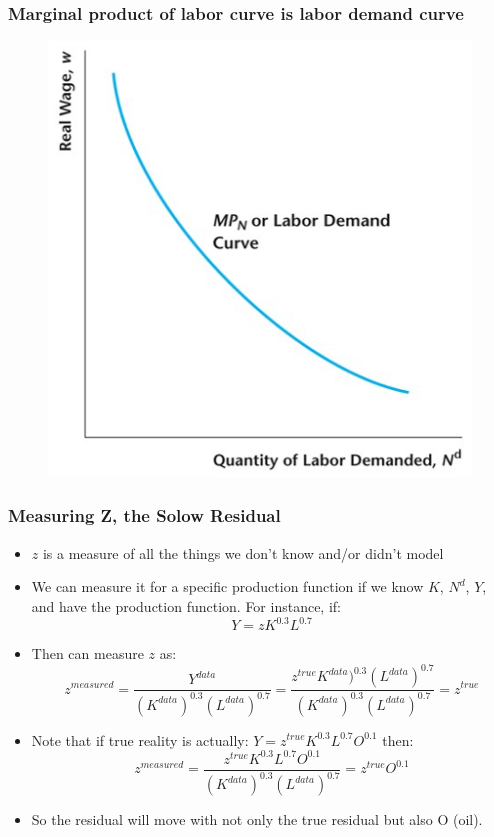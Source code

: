 \documentclass{beamer}
\begin{document}
\begin{frame}
\frametitle[alignment=center]{Marginal product of labor curve is labor demand curve}
\begin{figure}
\centering
\includegraphics[scale=0.5]{Figures/W_Fig_4pt20.png}
\end{figure}
\end{frame}


\begin{frame}
\frametitle[alignment=center]{Measuring Z, the Solow Residual}
\begin{itemize}
\item $z$ is a measure of all the things we don't know and/or didn't model
\bigskip
\item We can measure it for a specific production function if we know $K$, $N^d$, $Y$, and have the production function.  For instance, if:
$$Y=zK^0.3L^{0.7}$$
\item Then can measure $z$ as:
$$z^{measured}=\frac{Y^{data}}{(K^{data})^0.3(L^{data})^{0.7}}=\frac{z^{true}K^{data})^0.3(L^{data})^{0.7}}{(K^{data})^0.3(L^{data})^{0.7}}=z^{true}$$
\item Note that if true reality is actually: $Y=z^{true}K^{0.3}L^{0.7}O^{0.1}$ then:
$$z^{measured}=\frac{z^{true}K^{0.3}L^{0.7}O^{0.1}}{(K^{data})^{0.3}(L^{data})^{0.7}}=z^{true}O^{0.1}$$
\item So the residual will move with not only the true residual but also O (oil).  
\end{itemize}
\end{frame}
\end{document}
